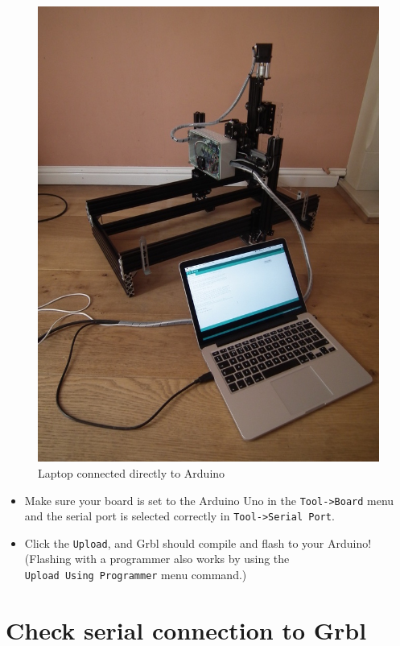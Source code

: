 \documentclass[
]{book}
\providecommand{\tightlist}{%
  \setlength{\itemsep}{0pt}\setlength{\parskip}{0pt}}
\begin{document}
\begin{figure}

{\centering \includegraphics[width=0.75\linewidth]{images/laptop_connected_to_arduino} 

}

\caption{Laptop connected directly to Arduino}\label{fig:laptop2arduino}
\end{figure}

\begin{itemize}
\tightlist
\item
  Make sure your board is set to the Arduino Uno in the \texttt{Tool-\textgreater{}Board} menu and the serial port is selected correctly in \texttt{Tool-\textgreater{}Serial\ Port}.
\item
  Click the \texttt{Upload}, and Grbl should compile and flash to your Arduino! (Flashing with a programmer also works by using the \texttt{Upload\ Using\ Programmer} menu command.)
\end{itemize}

\hypertarget{check-serial-connection-to-grbl}{%
\section{Check serial connection to Grbl}\label{check-serial-connection-to-grbl}}
\end{document}
